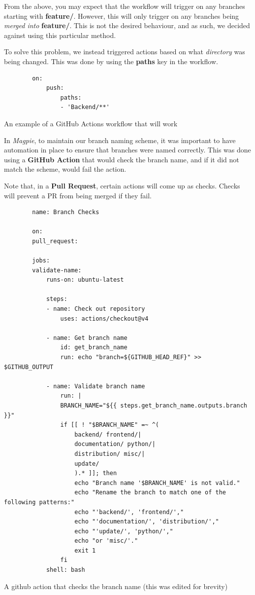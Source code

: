 \documentclass[preview]{standalone}
\begin{document}
From the above, you may expect that the workflow will trigger on any branches
starting with \textbf{feature/}. However, this will only trigger on any branches
being \textit{merged into} \textbf{feature/}. This is not the desired behaviour,
and as such, we decided against using this particular method.

To solve this problem, we instead triggered actions based on what \textit{directory} was
being changed. This was done by using the \textbf{paths} key in the workflow.

\begin{listing}[htbp]
    \centering{}
    \begin{verbatim}
        on:
            push:
                paths:
                - 'Backend/**'
    \end{verbatim}
    \caption{An example of a GitHub Actions workflow that will work}
\end{listing}

\newpage{}

In \textit{Magpie}, to maintain our branch naming scheme, it was important to
have automation in place to ensure that branches were named correctly. This was
done using a \textbf{GitHub Action} that would check the branch name, and if it
did not match the scheme, would fail the action.

Note that, in a \textbf{Pull Request}, certain actions will come up as checks. 
Checks will prevent a PR from being merged if they fail.

\begin{listing}[htbp]
    \begin{verbatim}
        name: Branch Checks

        on:
        pull_request:

        jobs:
        validate-name:
            runs-on: ubuntu-latest

            steps:
            - name: Check out repository
                uses: actions/checkout@v4

            - name: Get branch name
                id: get_branch_name
                run: echo "branch=${GITHUB_HEAD_REF}" >> $GITHUB_OUTPUT

            - name: Validate branch name
                run: |
                BRANCH_NAME="${{ steps.get_branch_name.outputs.branch }}"
                if [[ ! "$BRANCH_NAME" =~ ^(
                    backend/ frontend/|
                    documentation/ python/|
                    distribution/ misc/|
                    update/
                    ).* ]]; then
                    echo "Branch name '$BRANCH_NAME' is not valid."
                    echo "Rename the branch to match one of the following patterns:"
                    echo "'backend/', 'frontend/',"
                    echo "'documentation/', 'distribution/',"
                    echo "'update/', 'python/',"
                    echo "or 'misc/'."
                    exit 1
                fi
            shell: bash
    \end{verbatim}
    \caption{A github action that checks the branch name (this was edited for brevity)}
\end{listing}
\end{document}
